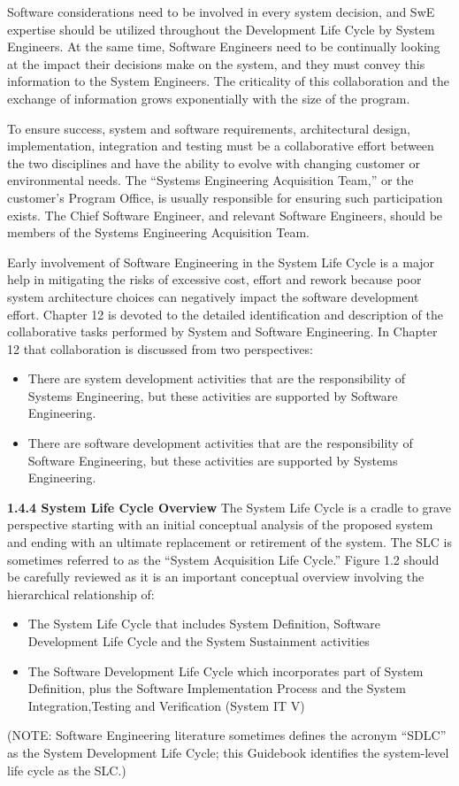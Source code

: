 \documentclass{book}
\begin{document}
\begin{multicols}{2}
Software considerations need to be involved in every system decision, and SwE expertise should be utilized throughout the Development Life Cycle by System Engineers. At the
same time, Software Engineers need to be continually looking at the impact their decisions make on the system, and they
must convey this information to the System Engineers. The
criticality of this collaboration and the exchange of information grows exponentially with the size of the program.

To ensure success, system and software requirements,
architectural design, implementation, integration and testing must be a collaborative effort between the two disciplines
and have the ability to evolve with changing customer or
environmental needs. The “Systems Engineering Acquisition
Team,” or the customer’s Program Office, is usually responsible for ensuring such participation exists. The Chief Software
Engineer, and relevant Software Engineers, should be members of the Systems Engineering Acquisition Team.

Early involvement of Software Engineering in the System
Life Cycle is a major help in mitigating the risks of excessive cost, effort and rework because poor system architecture choices can negatively impact the software development
effort. Chapter 12 is devoted to the detailed identification
and description of the collaborative tasks performed by
System and Software Engineering. In Chapter 12 that collaboration is discussed from two perspectives:

\begin{itemize}
	\item There are system development activities that are the
	responsibility of Systems Engineering, but these activities are supported by Software Engineering.
	\item There are software development activities that are the
	responsibility of Software Engineering, but these activities are supported by Systems Engineering.
\end{itemize}

\textbf{1.4.4 System Life Cycle Overview}
The System Life Cycle is a cradle to grave perspective starting
with an initial conceptual analysis of the proposed system
and ending with an ultimate replacement or retirement of
the system. The SLC is sometimes referred to as the “System
Acquisition Life Cycle.” Figure 1.2 should be carefully
reviewed as it is an important conceptual overview involving
the hierarchical relationship of:
\begin{itemize}
\item The System Life Cycle that includes System Definition,
Software Development Life Cycle and the System
Sustainment activities
\item The Software Development Life Cycle which incorporates part of System Definition, plus the Software
Implementation Process and the System Integration,Testing and Verification (System IT V)
\end{itemize}
(NOTE: Software Engineering literature sometimes
defines the acronym “SDLC” as the System Development 
Life Cycle; this Guidebook identifies the system-level life
cycle as the SLC.)


\end{multicols}
\end{document}
